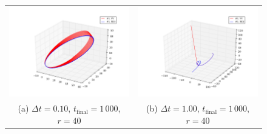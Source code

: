 \documentclass{article}
\begin{document}
\begin{multicols}{2}
\begin{figure}
\begin{center}
\begin{tabular}{cc}
  	\includegraphics[width=90mm]{Images/comparison_orbit_01_dist40.png}
	& \includegraphics[width=90mm]{Images/comparison_orbit_1_dist40.png} \\
	(a) $\Delta t = 0.10$, $t_{\mathrm{final}} = 1\,000$, $r = 40$				& (b) $\Delta t = 1.00$, $t_{\mathrm{final}} = 1\,000$, $r = 40$  \\[6pt]
	

\end{tabular}
\end{center}
\end{figure}
\end{multicols}
\end{document}
